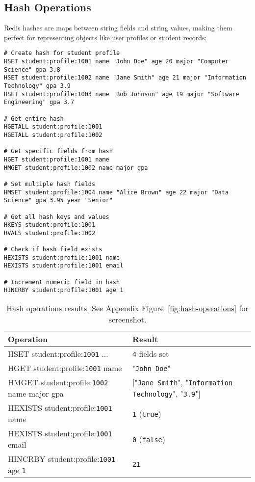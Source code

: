 \subsection{Hash Operations}

Redis hashes are maps between string fields and string values, making them perfect for representing objects like user profiles or student records:

\begin{verbatim}
# Create hash for student profile
HSET student:profile:1001 name "John Doe" age 20 major "Computer Science" gpa 3.8
HSET student:profile:1002 name "Jane Smith" age 21 major "Information Technology" gpa 3.9
HSET student:profile:1003 name "Bob Johnson" age 19 major "Software Engineering" gpa 3.7

# Get entire hash
HGETALL student:profile:1001
HGETALL student:profile:1002

# Get specific fields from hash
HGET student:profile:1001 name
HMGET student:profile:1002 name major gpa

# Set multiple hash fields
HMSET student:profile:1004 name "Alice Brown" age 22 major "Data Science" gpa 3.95 year "Senior"

# Get all hash keys and values
HKEYS student:profile:1001
HVALS student:profile:1002

# Check if hash field exists
HEXISTS student:profile:1001 name
HEXISTS student:profile:1001 email

# Increment numeric field in hash
HINCRBY student:profile:1001 age 1
\end{verbatim}

\begin{table}[H]
  \centering
  \begin{tabular}{|l|l|}
    \hline
    \textbf{Operation} & \textbf{Result} \\
    \hline
    HSET student:profile:\texttt{1001} ... & \texttt{4} fields set \\
    HGET student:profile:\texttt{1001} name & "\texttt{John Doe}" \\
    HMGET student:profile:\texttt{1002} name major gpa & ["\texttt{Jane Smith}", "\texttt{Information Technology}", "\texttt{3.9}"] \\
    HEXISTS student:profile:\texttt{1001} name & \texttt{1} (\texttt{true}) \\
    HEXISTS student:profile:\texttt{1001} email & \texttt{0} (\texttt{false}) \\
    HINCRBY student:profile:\texttt{1001} age \texttt{1} & \texttt{21} \\
    \hline
  \end{tabular}
  \caption{Hash operations results. See Appendix Figure~\ref{fig:hash-operations} for screenshot.}
\end{table}

